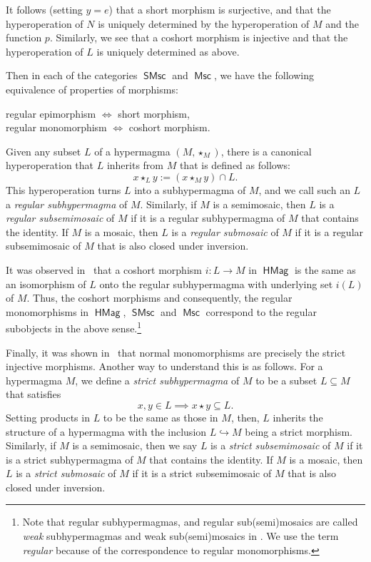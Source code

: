 \documentclass[reqno]{amsart}
\newcommand{\cat}[1]{\ensuremath{\mathsf{#1}}}
\DeclareMathOperator{\HMag}{\cat{HMag}}
\DeclareMathOperator{\Msc}{\cat{Msc}}
\DeclareMathOperator{\SMsc}{\cat{SMsc}}
\numberwithin{equation}{section}
\theoremstyle{plain}
\theoremstyle{definition}
\begin{document}
It follows (setting $y = e$) that a short morphism is surjective, and that the hyperoperation of $N$ is uniquely determined by the hyperoperation of $M$ and the function $p$. Similarly, we see that a coshort morphism is injective and that the hyperoperation of $L$ is uniquely determined as above. 

Then in each of the categories $\SMsc$ and $\Msc$, we have the following equivalence of properties of morphisms:
\begin{center}
regular epimorphism $\iff$ short morphism, \\
regular monomorphism $\iff$ coshort morphism.
\end{center}
Given any subset $L$ of a hypermagma $(M, \star_M)$, there is a canonical hyperoperation that $L$ inherits from $M$ that is defined as follows:
\[
x\star_L y := (x\star_M y)\cap L.
\] 
This hyperoperation turns $L$ into a subhypermagma of $M$, and we call such an $L$ a \textit{regular subhypermagma} of $M$. Similarly, if $M$ is a semimosaic, then $L$ is a \textit{regular subsemimosaic} of $M$ if it is a regular subhypermagma of $M$ that contains the identity. If $M$ is a mosaic, then $L$ is a \textit{regular submosaic} of $M$ if it is a regular subsemimosaic of $M$ that is also closed under inversion.

It was observed in~\cite{NakamuraReyes} that a coshort morphism $i: L \to M$ in $\HMag$ is the same as an isomorphism of $L$ onto the regular subhypermagma with underlying set $i(L)$ of $M$. Thus, the coshort morphisms and consequently, the regular monomorphisms in $\HMag$, $\SMsc$ and $\Msc$ correspond to the regular subobjects in the above sense.\footnote{Note that regular subhypermagmas, and regular sub(semi)mosaics are called \emph{weak} subhypermagmas and weak sub(semi)mosaics in \cite{NakamuraReyes}. We use the term \textit{regular} because of the correspondence to regular monomorphisms.}


Finally, it was shown in~\cite{NakamuraReyes} that normal monomorphisms are precisely the strict injective morphisms. Another way to understand this is as follows. For a hypermagma $M$, we define a \emph{strict subhypermagma} of $M$ to be a subset $L \subseteq M$ that satisfies
\[
x,y \in L \implies x \star y \subseteq L.
\] 
Setting products in $L$ to be the same as those in $M$, then, $L$ inherits the structure of a hypermagma with the inclusion $L \hookrightarrow M$ being a strict morphism. Similarly, if $M$ is a semimosaic, then we say $L$ is a \emph{strict subsemimosaic} of $M$ if it is a strict subhypermagma of $M$ that contains the identity. If $M$ is a mosaic, then $L$ is a \emph{strict submosaic} of $M$ if it is a strict subsemimosaic of $M$ that is also closed under inversion. 
\end{document}
